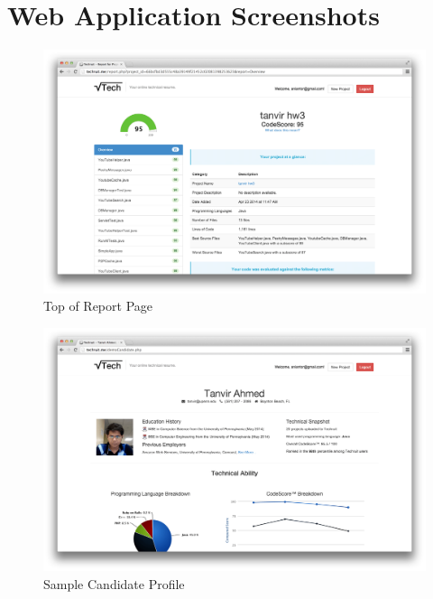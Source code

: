 \documentclass{sig-alternate}
\begin{document}
\vspace{175pt}
\appendix
\section{Web Application Screenshots}
\begin{figure}
	\begin{center}
		\includegraphics[width=500px]{report_overview1}
	\end{center}
	\vspace{-12pt}
	\caption{Top of Report Page}
	\label{fig:report1}
\end{figure}

\begin{figure}
	\begin{center}
		\includegraphics[width=500px]{sample_candidate}
	\end{center}
	\vspace{-12pt}
	\caption{Sample Candidate Profile}
	\label{fig:candidate}
\end{figure}
\end{document}
